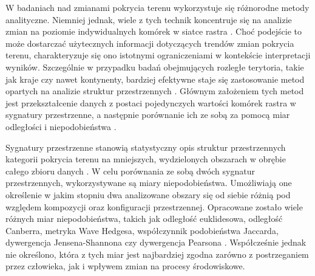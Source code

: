 \documentclass{amuthesis}
\begin{document}
W badaniach nad zmianami pokrycia terenu wykorzystuje się różnorodne
metody analityczne. Niemniej jednak, wiele z tych technik koncentruje
się na analizie zmian na poziomie indywidualnych komórek w siatce rastra
\autocite{ChangeDetectionTechniques}. Choć podejście to może dostarczać
użytecznych informacji dotyczących trendów zmian pokrycia terenu,
charakteryzuje się ono istotnymi ograniczeniami w kontekście
interpretacji wyników. Szczególnie w przypadku badań obejmujących
rozległe terytoria, takie jak kraje czy nawet kontynenty, bardziej
efektywne staje się zastosowanie metod opartych na analizie struktur
przestrzennych \autocite{Netzel2015}. Głównym założeniem tych metod jest
przekształcenie danych z postaci pojedynczych wartości komórek rastra w
sygnatury przestrzenne, a następnie porównanie ich ze sobą za pomocą
miar odległości i niepodobieństwa \autocite{nowosad_motif}.

Sygnatury przestrzenne stanowią statystyczny opis struktur
przestrzennych kategorii pokrycia terenu na mniejszych, wydzielonych
obszarach w obrębie całego zbioru danych \autocite{Jasiewicz_GeoPAT}. W
celu porównania ze sobą dwóch sygnatur przestrzennych, wykorzystywane są
miary niepodobieństwa. Umożliwiają one określenie w jakim stopniu dwa
analizowane obszary się od siebie różnią pod względem kompozycji oraz
konfiguracji przestrzennej. Opracowane zostało wiele różnych miar
niepodobieństwa, takich jak odległość euklidesowa, odległość Canberra,
metryka Wave Hedgesa, współczynnik podobieństwa Jaccarda, dywergencja
Jensena-Shannona czy dywergencja Pearsona \autocite{Cha2007}.
Współcześnie jednak nie określono, która z tych miar jest najbardziej
zgodna zarówno z postrzeganiem przez człowieka, jak i wpływem zmian na
procesy środowiskowe.
\end{document}
